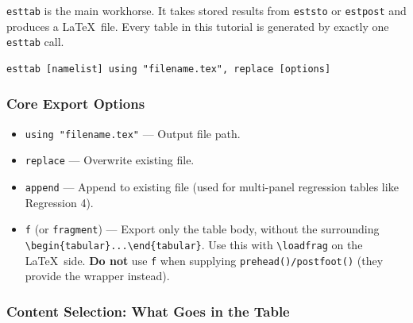 \documentclass[11pt]{article}
\numberwithin{table}{section}
\begin{document}
\texttt{esttab} is the main workhorse. It takes stored results from \texttt{eststo} or \texttt{estpost} and produces a \LaTeX\ file. Every table in this tutorial is generated by exactly one \texttt{esttab} call.

\begin{lstlisting}[style=stata]
esttab [namelist] using "filename.tex", replace [options]
\end{lstlisting}

\subsubsection{Core Export Options}

\begin{itemize}
    \item \texttt{using "filename.tex"} --- Output file path.
    \item \texttt{replace} --- Overwrite existing file.
    \item \texttt{append} --- Append to existing file (used for multi-panel regression tables like Regression 4).
    \item \texttt{f} (or \texttt{fragment}) --- Export only the table body, without the surrounding \texttt{\textbackslash begin\{tabular\}...\textbackslash end\{tabular\}}. Use this with \texttt{\textbackslash loadfrag} on the \LaTeX\ side. \textbf{Do not} use \texttt{f} when supplying \texttt{prehead()/postfoot()} (they provide the wrapper instead).
\end{itemize}

\subsubsection{Content Selection: What Goes in the Table}
\end{document}
